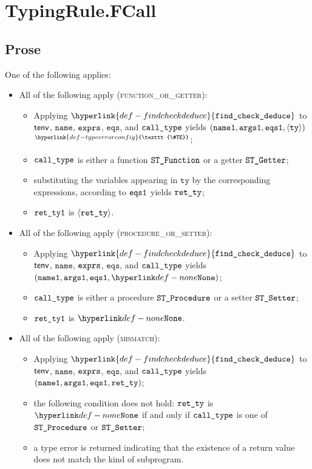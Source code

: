 \documentclass{book}
\newcommand\TypeErrorConfig[0]{\hyperlink{def-typeerrorconfig}{\texttt{\#TE}}}
\newcommand\ProseOrTypeError[0]{\hyperlink{def-proseortypeerror}{$^{\TypeErrorConfig}$}}
\newcommand\findcheckdeduce[0]{\hyperlink{def-findcheckdeduce}{\texttt{find\_check\_deduce}}}
\newcommand\tty[0]{\texttt{ty}}
\newcommand\eqs[0]{\texttt{eqs}}
\newcommand\nameone[0]{\texttt{name1}}
\newcommand\vargsone[0]{\texttt{args1}}
\newcommand\name[0]{\texttt{name}}
\begin{document}
\section{TypingRule.FCall \label{sec:TypingRule.FCall}}
\subsection{Prose}
One of the following applies:
\begin{itemize}
  \item All of the following apply (\textsc{function\_or\_getter}):
  \begin{itemize}
    \item Applying $\findcheckdeduce$ to $\textsf{tenv}$, $\name$, $\texttt{exprs}$, $\eqs$, and $\texttt{call\_type}$
    yields $(\nameone, \vargsone, \eqsone, \langle \tty \rangle)$ \ProseOrTypeError;
    \item $\texttt{call\_type}$ is either a function $\texttt{ST\_Function}$ or a getter $\texttt{ST\_Getter}$;
    \item substituting the variables appearing in $\tty$ by the corresponding expressions,
    according to $\texttt{eqs1}$ yields $\texttt{ret\_ty}$;
    \item $\texttt{ret\_ty1}$ is $\langle\texttt{ret\_ty}\rangle$.
  \end{itemize}

  \item All of the following apply (\textsc{procedure\_or\_setter}):
  \begin{itemize}
    \item Applying $\findcheckdeduce$ to $\textsf{tenv}$, $\name$, $\texttt{exprs}$, $\eqs$, and $\texttt{call\_type}$
    yields $(\nameone, \vargsone, \eqsone, \None)$;
    \item $\texttt{call\_type}$ is either a procedure $\texttt{ST\_Procedure}$ or a setter $\texttt{ST\_Setter}$;
    \item $\texttt{ret\_ty1}$ is $\None$.
  \end{itemize}

  \item All of the following apply (\textsc{mismatch}):
  \begin{itemize}
    \item Applying $\findcheckdeduce$ to $\textsf{tenv}$, $\name$, $\texttt{exprs}$, $\eqs$, and $\texttt{call\_type}$
    yields $(\nameone, \vargsone, \eqsone, \retty)$;
    \item the following condition does not hold:
    $\texttt{ret\_ty}$ is $\None$ if and only if $\texttt{call\_type}$ is one of $\texttt{ST\_Procedure}$ or $\texttt{ST\_Setter}$;
    \item a type error is returned indicating that the existence of a return value does not match
    the kind of subprogram.
  \end{itemize}
\end{itemize}
\end{document}

